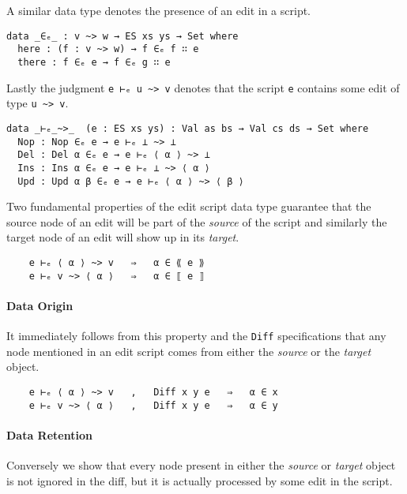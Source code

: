 \documentclass[preprint]{sigplanconf}
\begin{document}
    A similar data type denotes the presence of an edit in a script.

\begin{verbatim}
data _∈ₑ_ : v ~> w → ES xs ys → Set where
  here : (f : v ~> w) → f ∈ₑ f ∷ e
  there : f ∈ₑ e → f ∈ₑ g ∷ e
\end{verbatim}
    Lastly the judgment \texttt{e ⊢ₑ u \textasciitilde> v} denotes that
    the script \texttt{e} contains some edit of type \texttt{u \textasciitilde> v}.
\begin{verbatim}
data _⊢ₑ_~>_  (e : ES xs ys) : Val as bs → Val cs ds → Set where
  Nop : Nop ∈ₑ e → e ⊢ₑ ⊥ ~> ⊥
  Del : Del α ∈ₑ e → e ⊢ₑ ⟨ α ⟩ ~> ⊥
  Ins : Ins α ∈ₑ e → e ⊢ₑ ⊥ ~> ⟨ α ⟩
  Upd : Upd α β ∈ₑ e → e ⊢ₑ ⟨ α ⟩ ~> ⟨ β ⟩ 
\end{verbatim}
    Two fundamental properties of the edit script data type guarantee that
    the source node of an edit will be part of the \emph{source} of the script and
    similarly the target node of an edit will show up in its \emph{target}.
\begin{verbatim}
    e ⊢ₑ ⟨ α ⟩ ~> v   ⇒   α ∈ ⟪ e ⟫
    e ⊢ₑ v ~> ⟨ α ⟩   ⇒   α ∈ ⟦ e ⟧
\end{verbatim}

    \paragraph{Data Origin}

    It immediately follows from this property and the \texttt{Diff} specifications 
    that any node mentioned in an edit script comes from either the \emph{source}
    or the \emph{target} object.
\begin{verbatim}
    e ⊢ₑ ⟨ α ⟩ ~> v   ,   Diff x y e   ⇒   α ∈ x 
    e ⊢ₑ v ~> ⟨ α ⟩   ,   Diff x y e   ⇒   α ∈ y 
\end{verbatim}

    \paragraph{Data Retention}
    Conversely we show that every node present in either the \emph{source} or
    \emph{target} object is not ignored in the diff, but it is 
    actually processed by some edit in the script.
\end{document}
